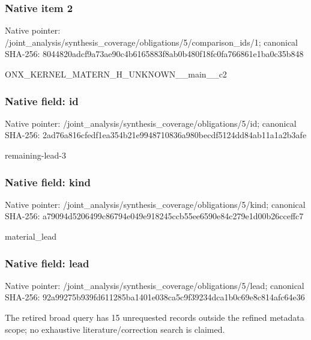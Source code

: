 \documentclass[10pt,a4paper]{article}
\begin{document}
\subsubsection{Native item 2}
Native pointer: /joint\_\allowbreak{}analysis/synthesis\_\allowbreak{}coverage/obligations/5/comparison\_\allowbreak{}ids/1; canonical SHA-256: 8044820adcf9a73ae90c4b6165883f8ab0b480f18fc0fa766861e1ba0c35b848

\begingroup\raggedright\sloppy ONX\_\allowbreak{}KERNEL\_\allowbreak{}MATERN\_\allowbreak{}H\_\allowbreak{}UNKNOWN\_\allowbreak{}\_\allowbreak{}main\_\allowbreak{}\_\allowbreak{}c2\par\endgroup

\subsubsection{Native field: id}
Native pointer: /joint\_\allowbreak{}analysis/synthesis\_\allowbreak{}coverage/obligations/5/id; canonical SHA-256: 2ad76a816cfedf1ea354b21e9948710836a980becdf5124dd84ab11a1a2b3afe

\begingroup\raggedright\sloppy remaining-lead-3\par\endgroup

\subsubsection{Native field: kind}
Native pointer: /joint\_\allowbreak{}analysis/synthesis\_\allowbreak{}coverage/obligations/5/kind; canonical SHA-256: a79094d5206499c86794e049e918245ccb55ee6590e84c279e1d00b26cceffc7

\begingroup\raggedright\sloppy material\_\allowbreak{}lead\par\endgroup

\subsubsection{Native field: lead}
Native pointer: /joint\_\allowbreak{}analysis/synthesis\_\allowbreak{}coverage/obligations/5/lead; canonical SHA-256: 92a99275b939fd611285ba1401e038ca5c9f39234dca1b0c69e8c814afc64e36

\begingroup\raggedright\sloppy The retired broad query has 15 unrequested records outside the refined metadata scope;\allowbreak{} no exhaustive literature/\allowbreak{}correction search is claimed.\par\endgroup
\end{document}
